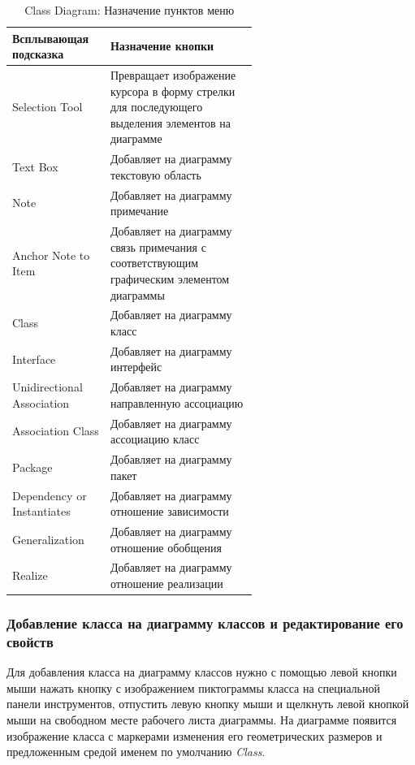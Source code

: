 \documentclass[a4paper,12pt]{report}
\begin{document}
\begin{table}[htbp]
	
	\begin{center}
		\begin{tabular}{|l|m{0.6\linewidth}|}
			\hline
			\textbf{Всплывающая подсказка} & \textbf{Назначение кнопки} \\ \hline
			Selection Tool & Превращает изображение курсора в форму стрелки для последующего выделения элементов на диаграмме \\ \hline
			Text Box & Добавляет на диаграмму текстовую область \\ \hline
			Note & Добавляет на диаграмму примечание \\ \hline
			Anchor Note to Item & Добавляет на диаграмму связь примечания с соответствующим графическим элементом диаграммы \\ \hline
			Class & Добавляет на диаграмму класс \\ \hline
			Interface & Добавляет на диаграмму интерфейс \\ \hline
			Unidirectional Association & Добавляет на диаграмму направленную ассоциацию \\ \hline
			Association Class & Добавляет на диаграмму ассоциацию класс \\ \hline
			Package & Добавляет на диаграмму пакет \\ \hline
			Dependency or Instantiates & Добавляет на диаграмму отношение зависимости \\ \hline
			Generalization & Добавляет на диаграмму отношение обобщения \\ \hline
			Realize & Добавляет на диаграмму отношение реализации \\ \hline
		\end{tabular}
	\end{center}
	\caption{Class Diagram: Назначение пунктов меню}
	\label{tab:toolboxclass}
\end{table}
\subsubsection*{Добавление класса на диаграмму классов и редактирование его свойств}
Для добавления класса на диаграмму классов нужно с помощью левой кнопки мыши нажать кнопку с изображением пиктограммы класса на специальной панели инструментов, отпустить левую кнопку мыши и щелкнуть левой кнопкой мыши на свободном месте рабочего листа диаграммы. На диаграмме появится изображение класса с маркерами изменения его геометрических размеров и предложенным средой именем по умолчанию \textit{Class}.
\end{document}
